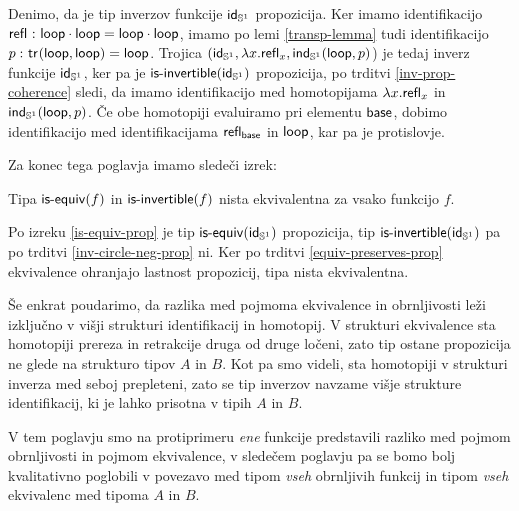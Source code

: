 \begin{dokaz}
  Denimo, da je tip inverzov funkcije \(\textnormal{\textsf{id}}_{\mathbb{S}^{1}}\) propozicija. Ker imamo identifikacijo \(\textnormal{\textsf{refl}}_{} \,\colon \textnormal{\textsf{loop}} \cdot \textnormal{\textsf{loop}} = \textnormal{\textsf{loop}} \cdot \textnormal{\textsf{loop}}\), imamo po lemi \ref{transp-lemma} tudi identifikacijo \(p \,\colon \textnormal{\textsf{tr}}_{}(\textnormal{\textsf{loop}}, \textnormal{\textsf{loop}}) = \textnormal{\textsf{loop}}\). Trojica
  \((\textnormal{\textsf{id}}_{\mathbb{S}^{1}}, \lambda x. \textnormal{\textsf{refl}}_{x}, \textnormal{\textsf{ind}}_{\mathbb{S}^{1}}(\textnormal{\textsf{loop}}, p)\)) je tedaj inverz funkcije \(\textnormal{\textsf{id}}_{\mathbb{S}^{1}}\), ker pa je \(\textnormal{\textsf{is-invertible}}(\textnormal{\textsf{id}}_{\mathbb{S}^{1}})\) propozicija, po trditvi \ref{inv-prop-coherence} sledi, da imamo identifikacijo med homotopijama
  \(\lambda x.\textnormal{\textsf{refl}}_{x}\) in \(\textnormal{\textsf{ind}}_{\mathbb{S}^{1}}(\textnormal{\textsf{loop}}, p)\). Če obe homotopiji evaluiramo pri elementu \(\textnormal{\textsf{base}}\), dobimo identifikacijo med identifikacijama \(\textnormal{\textsf{refl}}_{\textnormal{\textsf{base}}}\) in \(\textnormal{\textsf{loop}}\), kar pa je protislovje.
\end{dokaz}

Za konec tega poglavja imamo sledeči izrek:

\begin{izrek}
  Tipa \(\textnormal{\textsf{is-equiv}}(f)\) in \(\textnormal{\textsf{is-invertible}}(f)\) nista ekvivalentna za vsako funkcijo \(f\).
\end{izrek}

\begin{dokaz}
  Po izreku \ref{is-equiv-prop} je tip \(\textnormal{\textsf{is-equiv}}(\textnormal{\textsf{id}}_{\mathbb{S}^{1}})\) propozicija, tip \(\textnormal{\textsf{is-invertible}}(\textnormal{\textsf{id}}_{\mathbb{S}^{1}})\) pa po trditvi \ref{inv-circle-neg-prop} ni. Ker po trditvi \ref{equiv-preserves-prop} ekvivalence ohranjajo lastnost propozicij, tipa nista ekvivalentna.
\end{dokaz}

Še enkrat poudarimo, da razlika med pojmoma ekvivalence in obrnljivosti leži izključno v višji strukturi identifikacij in homotopij. V strukturi ekvivalence sta homotopiji prereza in retrakcije druga od druge ločeni, zato tip ostane propozicija ne glede na strukturo tipov \(A\) in \(B\). Kot pa smo videli, sta homotopiji v strukturi inverza med seboj prepleteni, zato se tip inverzov navzame višje strukture identifikacij, ki je lahko prisotna v tipih \(A\) in \(B\).

V tem poglavju smo na protiprimeru \emph{ene} funkcije predstavili razliko med pojmom obrnljivosti in pojmom ekvivalence, v sledečem poglavju pa se bomo bolj kvalitativno poglobili v povezavo med tipom \emph{vseh} obrnljivih funkcij in tipom \emph{vseh} ekvivalenc med tipoma \(A\) in \(B\).

